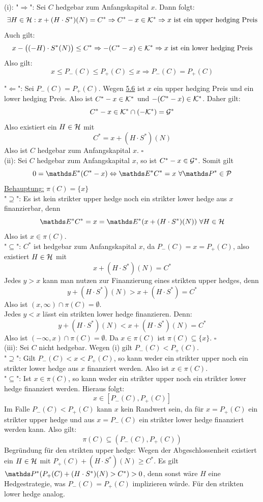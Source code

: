 \\
(i): "$\Rightarrow$":
Sei $C$ hedgebar zum Anfangskapital $x$.
Dann folgt:
\[
\exists H\in\mathcal{H}: x+(H\cdot S^*)(N)=C^* \Rightarrow C^*-x\in \mathcal{K}^* \Rightarrow x\text{ ist ein upper hedging Preis}
\]
Auch gilt:
\[
x-\big((-H)\cdot S^*(N)\big)\le C^* \Rightarrow -(C^*-x)\in\mathcal{K}^* \Rightarrow x\text{ ist ein lower hedging Preis}
\]
Also gilt:
\[
x\le P_-(C)\le P_+(C)\le x \Rightarrow P_-(C)=P_+(C)
\]

"$\Leftarrow$":
Sei $P_-(C)=P_+(C)$.
Wegen \hyperref[sub:upper_lower_preise]{5.6} ist $x$ ein upper hedging Preis und ein lower hedging Preis.
Also ist $C^*-x\in \mathcal{K}^*$ und $-(C^*-x)\in\mathcal{K}^*$.
Daher gilt:
\[
C^*-x\in \mathcal{K}^*\cap (-\mathcal{K^*})=\mathcal{G}^*
\]
Also existiert ein $H\in\mathcal{H}$ mit 
\[
C^*= x+(H\cdot S^*)(N)
\]
Also ist $C$ hedgebar zum Anfangskapital $x$.
\hfill $\square$\\

(ii):
Sei $C$ hedgebar zum Anfangskapital $x$, so ist $C^*-x\in\mathcal{G}^*$.
Somit gilt
\[
0=\E^*(C^*-x) \Leftrightarrow \E^*C^*=x~\forall \Pw^*\in\mc{P}
\]
\uline{Behauptung:}
$\pi(C)=\{x\}$\\
"$\supseteq$":
Es ist kein strikter upper hedge noch ein strikter lower hedge aus $x$ finanzierbar, denn 
\[
\E^*C^* = x =  \E^*(x+(H\cdot S^*)(N))~\forall H\in\mc{H}
\]
Also ist $x\in\pi(C)$.\\

"$\subseteq$":
$C^*$ ist hedgebar zum Anfangskapital $x$, da $P_-(C)=x=P_+(C)$, also existiert $H\in\mathcal{H}$ mit
\[
x+(H\cdot S^*)(N)=C^*
\]
Jedes $y>x$ kann man nutzen zur Finanzierung eines strikten upper hedges, denn 
\[
y+(H\cdot S^*)(N)>x+(H\cdot S^*)=C^*
\]
Also ist $(x,\infty)\cap \pi(C)=\emptyset$.\\
Jedes $y<x$ lässt ein strikten lower hedge finanzieren.
Denn:
\[
y+(H\cdot S^*)(N)<x+(H\cdot S^*)(N)=C^*
\]
Also ist $(-\infty,x)\cap\pi(C)=\emptyset$.
Da $x\in\pi(C)$ ist $\pi(C)\subseteq \{x\}$.
\hfill $\square$\\

(iii):
Sei $C$ nicht hedgebar.
Wegen (i) gilt $P_-(C)<P_+(C)$.\\
"$\supseteq$":
Gilt $P_-(C)<x<P_+(C)$, so kann weder ein strikter upper noch ein strikter lower hedge aus $x$ finanziert werden.
Also ist $x\in \pi(C)$.\\
"$\subseteq$":
Ist $x\in\pi(C)$, so kann weder ein strikter upper noch ein strikter lower hedge finanziert werden.
Hieraus folgt:
\[
x\in [P_-(C),P_+(C)]
\]
Im Falle $P_-(C)<P_+(C)$ kann $x$ kein Randwert sein, da für $x=P_+(C)$ ein strikter upper hedge und aus $x=P_-(C)$ ein strikter lower hedge finanziert werden kann.
Also gilt:
\[
\pi(C)\subseteq (P_-(C),P_+(C))
\]
Begründung für den strikten upper hedge:
Wegen der Abgeschlossenheit existiert ein $H\in\mathcal{H}$ mit $P_+(C)+(H\cdot S^*)(N)\ge C^*$.
Es gilt $\Pw^*(P_+(C)+(H\cdot S^*)(N)>C^*)>0$, denn sonst wäre $H$ eine Hedgestrategie, was $P_-(C)=P_+(C)$ implizieren würde.
Für den strikten lower hedge analog.\\


